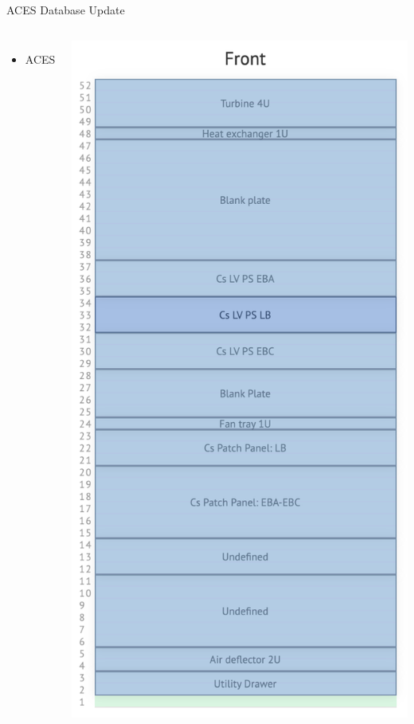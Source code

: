 \documentclass[aspectratio=169,xcolor=table]{beamer}
\begin{document}
\begin{frame}[t]{ACES Database Update}
\begin{columns}
          \begin{itemize}
          \item ACES
          \end{itemize}
          \includegraphics[height=.6\textheight,keepaspectratio=true]{Y.04-16.A1_ACES.png}
      \end{columns}
    \end{frame}
\end{document}
